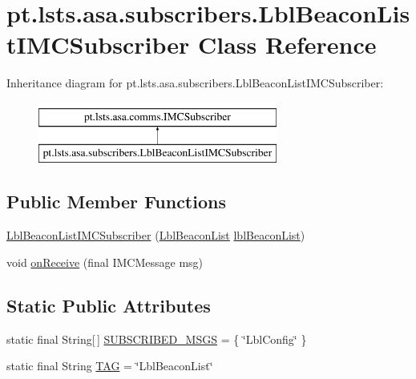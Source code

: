 \hypertarget{classpt_1_1lsts_1_1asa_1_1subscribers_1_1LblBeaconListIMCSubscriber}{}\section{pt.\+lsts.\+asa.\+subscribers.\+Lbl\+Beacon\+List\+I\+M\+C\+Subscriber Class Reference}
\label{classpt_1_1lsts_1_1asa_1_1subscribers_1_1LblBeaconListIMCSubscriber}
Inheritance diagram for pt.\+lsts.\+asa.\+subscribers.\+Lbl\+Beacon\+List\+I\+M\+C\+Subscriber\+:\begin{figure}[H]
\begin{center}
\leavevmode
\includegraphics[height=2.000000cm]{classpt_1_1lsts_1_1asa_1_1subscribers_1_1LblBeaconListIMCSubscriber}
\end{center}
\end{figure}
\subsection*{Public Member Functions}
\begin{DoxyCompactItemize}
\item 
\hyperlink{classpt_1_1lsts_1_1asa_1_1subscribers_1_1LblBeaconListIMCSubscriber_ad23f9fc807afeb565ee5f1cf62875199}{Lbl\+Beacon\+List\+I\+M\+C\+Subscriber} (\hyperlink{classpt_1_1lsts_1_1asa_1_1pos_1_1LblBeaconList}{Lbl\+Beacon\+List} \hyperlink{classpt_1_1lsts_1_1asa_1_1subscribers_1_1LblBeaconListIMCSubscriber_aeff98fec2248ed71734e4027cae8f22c}{lbl\+Beacon\+List})
\item 
void \hyperlink{classpt_1_1lsts_1_1asa_1_1subscribers_1_1LblBeaconListIMCSubscriber_aa82d48614e999086b15ef7b952d38a0d}{on\+Receive} (final I\+M\+C\+Message msg)
\end{DoxyCompactItemize}
\subsection*{Static Public Attributes}
\begin{DoxyCompactItemize}
\item 
static final String\mbox{[}$\,$\mbox{]} \hyperlink{classpt_1_1lsts_1_1asa_1_1subscribers_1_1LblBeaconListIMCSubscriber_a7295ca3b36dc60fb9f3ecd04e2589de2}{S\+U\+B\+S\+C\+R\+I\+B\+E\+D\+\_\+\+M\+S\+G\+S} = \{ \char`\"{}Lbl\+Config\char`\"{} \}
\item 
static final String \hyperlink{classpt_1_1lsts_1_1asa_1_1subscribers_1_1LblBeaconListIMCSubscriber_a32c2d10354ceba194c068d3acd295d5e}{T\+A\+G} = \char`\"{}Lbl\+Beacon\+List\char`\"{}
\end{DoxyCompactItemize}
